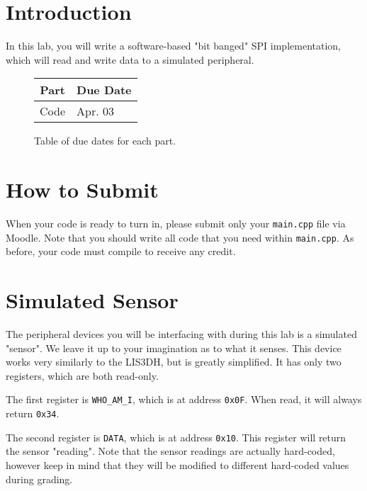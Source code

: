 \documentclass{article}
\begin{document}
\section{Introduction}

In this lab, you will write a software-based "bit banged" SPI implementation,
which will read and write data to a simulated peripheral.

\begin{figure}[H]

	\centering

	\begin{tabular}{r|l}

		Part & Due Date \\ \hline\hline
		Code & Apr. 03\\ \hline

	\end{tabular}

	\caption{Table of due dates for each part.}

\end{figure}

\tableofcontents

\section{How to Submit }

When your code is ready to turn in, please submit only your \texttt{main.cpp}
file via Moodle. Note that you should write all code that you need within
\texttt{main.cpp}. As before, your code must compile to receive any credit.

\section{Simulated Sensor}

The peripheral devices you will be interfacing with during this lab is a
simulated "sensor". We leave it up to your imagination as to what it senses.
This device works very similarly to the LIS3DH, but is greatly simplified. It
has only two registers, which are both read-only.

The first register is \texttt{WHO\_AM\_I}, which is at address \texttt{0x0F}.
When read, it will always return \texttt{0x34}.

The second register is \texttt{DATA}, which is at address \texttt{0x10}. This
register will return the sensor "reading". Note that the sensor readings are
actually hard-coded, however keep in mind that they will be modified to
different hard-coded values during grading.
\end{document}
